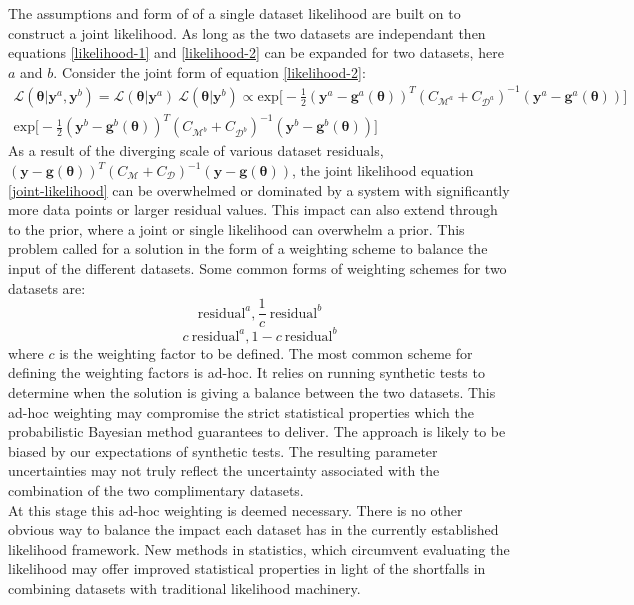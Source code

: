 The assumptions and form of of a single dataset likelihood are built on to construct a joint likelihood. As long as the two datasets are independant then equations \ref{likelihood-1} and \ref{likelihood-2} can be expanded for two datasets, here $a$ and $b$. Consider the joint form of equation \ref{likelihood-2}:
\begin{multline}
\mathcal{L}(\bm{\theta}|\bm{y}^a,\bm{y}^b) = \mathcal{L}(\bm{\theta}|\bm{y}^a)\ \mathcal{L}(\bm{\theta}|\bm{y}^b)
\propto \text{exp}\bigg[-\frac{1}{2}(\bm{y}^a-\bm{g}^a(\bm{\theta}))^T(C_{\mathcal{M}^a}+C_{\mathcal{D}^a})^{-1}(\bm{y}^a-\bm{g}^a(\bm{\theta}))\bigg]\ \\
\text{exp}\bigg[-\frac{1}{2}(\bm{y}^b-\bm{g}^b(\bm{\theta}))^T(C_{\mathcal{M}^b}+C_{\mathcal{D}^b})^{-1}(\bm{y}^b-\bm{g}^b(\bm{\theta}))\bigg]
\label{joint-likelihood}
\end{multline}
As a result of the diverging scale of various dataset residuals, $(\bm{y}-\bm{g}(\bm{\theta}))^T(C_{\mathcal{M}}+C_{\mathcal{D}})^{-1}(\bm{y}-\bm{g}(\bm{\theta}))$, the joint likelihood equation \ref{joint-likelihood} can be overwhelmed or dominated by a system with significantly more data points or larger residual values. This impact can also extend through to the prior, where a joint or single likelihood can overwhelm a prior. This problem called for a solution in the form of a weighting scheme to balance the input of the different datasets. Some common forms of weighting schemes for two datasets are:
\begin{equation}
\text{residual}^a, \frac{1}{c}\ \text{residual}^b
\end{equation}
\begin{equation}
c\ \text{residual}^a, 1-c\ \text{residual}^b
\end{equation}
where $c$ is the weighting factor to be defined. The most common scheme for defining the weighting factors is ad-hoc. It relies on running synthetic tests to determine when the solution is giving a balance between the two datasets. This ad-hoc weighting may compromise the strict statistical properties which the probabilistic Bayesian method guarantees to deliver. The approach is likely to be biased by our expectations of synthetic tests. The resulting parameter uncertainties may not truly reflect the uncertainty associated with the combination of the two complimentary datasets. \\

At this stage this ad-hoc weighting is deemed necessary. There is no other obvious way to balance the impact each dataset has in the currently established likelihood framework. New methods in statistics, which circumvent evaluating the likelihood may offer improved statistical properties in light of the shortfalls in combining datasets with traditional likelihood machinery. \\


